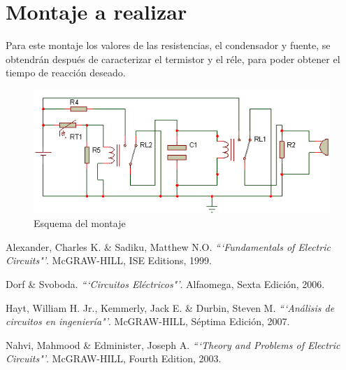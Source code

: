 \documentclass[twocolumn]{IEEEtran}
\begin{document}
\section{Montaje a realizar}
\noindent
Para este montaje los valores de las resistencias, el condensador y fuente, se obtendrán después de caracterizar el termistor y el réle, para poder obtener el tiempo de reacción deseado.
\begin{figure}[H]
	\centering
		\includegraphics[scale=1]{montaje.png}
	\caption{Esquema del montaje}
	\label{fig2}
\end{figure} 


\begin{thebibliography}{99}
 Alexander, Charles K. \&  Sadiku, Matthew N.O.
{\em ```Fundamentals of Electric Circuits"'}.
McGRAW-HILL, ISE Editions, 1999.

 Dorf  \& Svoboda.
{\em ```Circuitos Eléctricos"'}.
Alfaomega, Sexta Edición, 2006.

 Hayt, William H. Jr., Kemmerly, Jack E. \& Durbin, Steven M.
{\em ```Análisis de circuitos en ingeniería"'}.
McGRAW-HILL, Séptima Edición, 2007.

 Nahvi, Mahmood \& Edminister, Joseph A.
{\em ```Theory and Problems of Electric Circuits"'}.
McGRAW-HILL, Fourth Edition, 2003.

\end{thebibliography}
\end{document}
